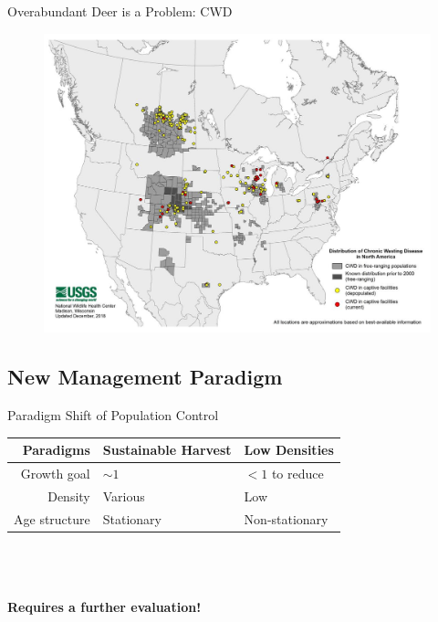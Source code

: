 \documentclass{beamer}
\begin{document}
\begin{frame}{Overabundant Deer is a Problem: CWD}
\begin{figure}[ht]
\centering
\includegraphics[scale=0.8]{fig/Chicago_deer/CWD.jpg}
\label{cwd}
\end{figure}
\end{frame}

\subsection{New Management Paradigm}

\begin{frame}{Paradigm Shift of Population Control}
\renewcommand\baselinestretch{1.5}\selectfont
	\begin{tabular}{r l l}
		\toprule
		Paradigms  &\textbf{Sustainable Harvest} &\textbf{Low Densities} \\ 
		\midrule
		\pause
	    Growth goal & $\sim1$  &$<1$ to reduce \\ \pause
	    Density & Various & Low \\ \pause
		Age structure & Stationary  & Non-stationary  \\
		\bottomrule
	\end{tabular}\pause
\renewcommand\baselinestretch{1}\selectfont
\\
\\
\\
\textbf{Requires a further evaluation!}
\end{frame}
\end{document}
